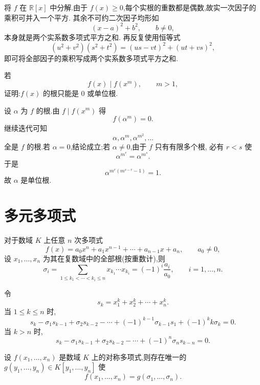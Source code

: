 \begin{solution}
将 $f$ 在 $\mathbb{R}[x]$ 中分解.由于 $f(x)\ge0$,每个实根的重数都是偶数,故实一次因子的乘积可并入一个平方.
其余不可约二次因子均形如
\[
  (x-a)^2+b^2,
  \qquad b\ne0,
\]
本身就是两个实系数多项式平方之和.
再反复使用恒等式
\[
  (u^2+v^2)(s^2+t^2)
  =(us-vt)^2+(ut+vs)^2,
\]
即可将全部因子的乘积写成两个实系数多项式平方之和.
\end{solution}

\begin{example}
若
\[
  f(x)\mid f(x^m),
  \qquad m>1,
\]
证明:$f(x)$ 的根只能是 $0$ 或单位根.
\end{example}
\exampleblank

\begin{solution}
设 $\alpha$ 为 $f$ 的根.由 $f\mid f(x^m)$ 得
\[
  f(\alpha^m)=0.
\]
继续迭代可知
\[
  \alpha,\alpha^m,\alpha^{m^2},\ldots
\]
全是 $f$ 的根.若 $\alpha=0$,结论成立;若 $\alpha\ne0$,由于 $f$ 只有有限多个根,
必有 $r<s$ 使
\[
  \alpha^{m^r}=\alpha^{m^s}.
\]
于是
\[
  \alpha^{m^r(m^{s-r}-1)}=1.
\]
故 $\alpha$ 是单位根.
\end{solution}


\newpage

\section{多元多项式}

\begin{theorem}
对于数域 $K$ 上任意 $n$ 次多项式
\[
  f(x)=a_0x^n+a_1x^{n-1}+\cdots+a_{n-1}x+a_n,
  \qquad a_0\ne0,
\]
设 $x_1,\ldots,x_n$ 为其在复数域中的全部根(按重数计),则
\[
  \sigma_i
  =\sum\limits_{1\le k_1<\cdots<k_i\le n}
  x_{k_1}\cdots x_{k_i}
  =(-1)^i\dfrac{a_i}{a_0},
  \qquad i=1,\ldots,n.
\]
\end{theorem}

\begin{theorem}
令
\[
  s_k=x_1^k+x_2^k+\cdots+x_n^k.
\]
当 $1\le k\le n$ 时,
\[
  s_k-\sigma_1s_{k-1}+\sigma_2s_{k-2}-\cdots
  +(-1)^{k-1}\sigma_{k-1}s_1+(-1)^k k\sigma_k=0.
\]
当 $k>n$ 时,
\[
  s_k-\sigma_1s_{k-1}+\sigma_2s_{k-2}-\cdots
  +(-1)^n\sigma_ns_{k-n}=0.
\]
\end{theorem}

\begin{theorem}[\markstar]
设 $f(x_1,\ldots,x_n)$ 是数域 $K$ 上的对称多项式,则存在唯一的
$g(y_1,\ldots,y_n)\in K[y_1,\ldots,y_n]$ 使
\[
  f(x_1,\ldots,x_n)=g(\sigma_1,\ldots,\sigma_n).
\]
\end{theorem}

